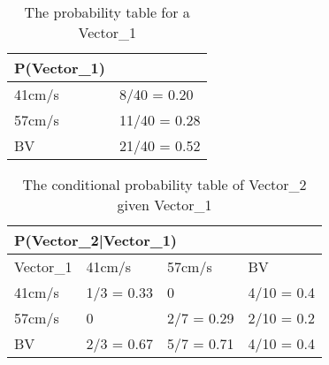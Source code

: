 \begin{table}[H]
\centering
\begin{tabular}{|l|l|}
\hline
P(Vector\_1) &\\ \hline
41cm/s & 8/40 = 0.20   \\ \hline 
57cm/s & 11/40 = 0.28  \\ \hline
BV & 21/40 = 0.52  \\ \hline
\end{tabular}
\caption{The probability table for a Vector\_1}
\label{Vector0Table}
\end{table}

\begin{table}[H]
\centering
\begin{tabular}{|l|l|l|l|}
\hline
\multicolumn{4}{|l|}{P(Vector\_2|Vector\_1)} \\ \hline
 Vector\_1 & 41cm/s    & 57cm/s    & BV    \\ \hline
 41cm/s    & 1/3 = 0.33 & 0     & 4/10 = 0.4    \\ \hline
 57cm/s    & 0          & 2/7 = 0.29 & 2/10 = 0.2  \\ \hline
 BV        & 2/3 = 0.67 & 5/7 = 0.71 & 4/10 = 0.4  \\ \hline
\end{tabular}
\caption{The conditional probability table of Vector\_2 given Vector\_1}
\label{vector2tab}
\end{table}


